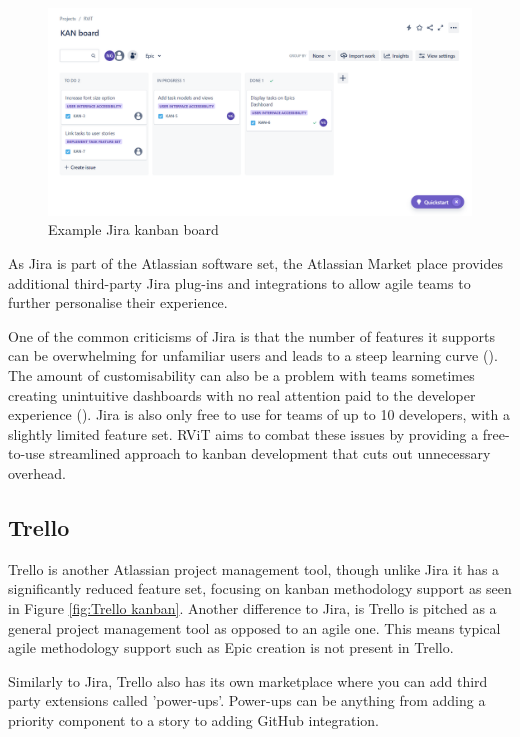 \documentclass[l4proj.tex]{subfiles}
\begin{document}
\begin{figure}[h!]
\begin{center}
\includegraphics[scale=0.35]{dissertation/images/JiraKanbanBoard.png}
\caption{Example Jira kanban board}
\label{fig:Jira kanban} 
\end{center}
\end{figure}

As Jira is part of the Atlassian software set, the Atlassian Market place provides additional third-party Jira plug-ins and integrations to allow agile teams to further personalise their experience.  

One of the common criticisms of Jira is that the number of features it supports can be overwhelming for unfamiliar users and leads to a steep learning curve (\cite{JiraProblemsFeatures}). The amount of customisability can also be a problem with teams sometimes creating unintuitive dashboards with no real attention paid to the developer experience (\cite{JiraProblemsFlexible}). Jira is also only free to use for teams of up to 10 developers, with a slightly limited feature set. RViT aims to combat these issues by providing a free-to-use streamlined approach to kanban development that cuts out unnecessary overhead.


\subsection{Trello}
Trello is another Atlassian project management tool, though unlike Jira it has a significantly reduced feature set, focusing on kanban methodology support as seen in Figure \ref{fig:Trello kanban}. Another difference to Jira, is Trello is pitched as a general project management tool as opposed to an agile one. This means typical agile methodology support such as Epic creation is not present in Trello.

Similarly to Jira, Trello also has its own marketplace where you can add third party extensions called 'power-ups'. Power-ups can be anything from adding a priority component to a story to adding GitHub integration.
\end{document}

